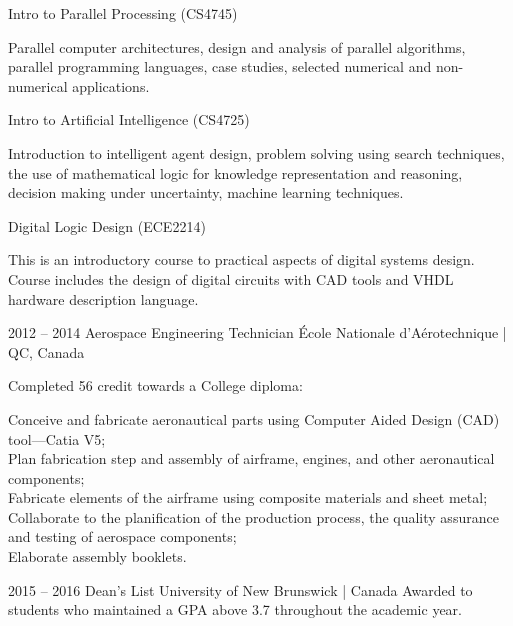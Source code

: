 \documentclass{developercv} %
\begin{document}
\begin{entrylist}
{		\textbullet{} Intro to Parallel Processing (CS4745)
		\begin{smallQuote}
			Parallel computer architectures, design and analysis of parallel algorithms, parallel programming languages, case studies, selected numerical and non-numerical applications.
		\end{smallQuote}

		\textbullet{} Intro to Artificial Intelligence (CS4725)
		\begin{smallQuote}
			Introduction to intelligent agent design, problem solving using search techniques, the use of mathematical logic for knowledge representation and reasoning, decision making under uncertainty, machine learning techniques.
		\end{smallQuote}

		\textbullet{} Digital Logic Design (ECE2214)
		\begin{smallQuote}
			This is an introductory course to practical aspects of digital systems design. Course includes the design of digital circuits with CAD tools and VHDL hardware description language.
		\end{smallQuote}
	}

	\entry
	{2012 -- 2014}
	{Aerospace Engineering Technician}
	{École Nationale d'Aérotechnique | QC, Canada}
	{Completed 56 credit towards a College diploma:
		\begin{smallQuote}
			Conceive and fabricate aeronautical parts using Computer Aided Design (CAD) tool---Catia V5;\\
			Plan fabrication step and assembly of airframe, engines, and other aeronautical components;\\
			Fabricate elements of the airframe using composite materials and sheet metal;\\
			Collaborate to the planification of the production process, the quality assurance and testing of aerospace components;\\
			Elaborate assembly booklets.
		\end{smallQuote}
	}

\end{entrylist}


\begin{entrylist}
	\entry
	{2015 -- 2016}
	{Dean's List}
	{University of New Brunswick | Canada}
	{Awarded to students who maintained a GPA above 3.7 throughout the academic year.}
\end{entrylist}
\end{document}
